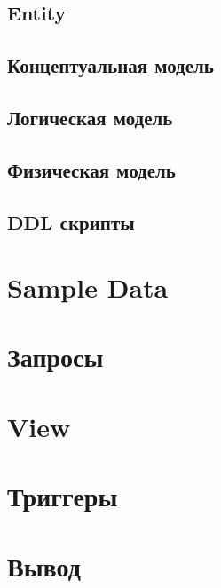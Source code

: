 \documentclass[a4paper]{article}
\begin{document}
\subsection{Entity}

\subsection{Концептуальная модель}

\subsection{Логическая модель}

\subsection{Физическая модель}

\subsection{DDL скрипты}

\section{Sample Data}

\section{Запросы}


\section{View}

\section{Триггеры}

\section{Вывод}
\end{document}
